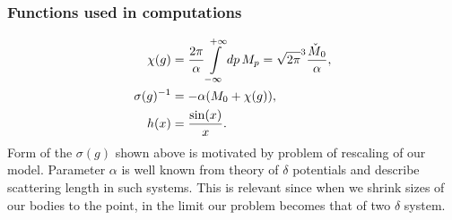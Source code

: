 \documentclass[10pt,t]{beamer}
\begin{document}
\begin{frame}
  \frametitle{Functions used in computations}

  \vspace{-2em}


  \begin{subequations}
    \begin{align}
      \label{eq:Scalar-field-and-two-quasi-deltas-07-A}
      \chi( g )
      &=
        \frac{ 2 \pi }{ \alpha }
        \int\limits_{ -\infty }^{ +\infty } dp \, M_{ p } =
        \sqrt{ 2 \pi }^{ 3 } \frac{ \check{M}_{ \hspace{0.05em} 0 } }{ \alpha }, \\
      \label{eq:Scalar-field-and-two-quasi-deltas-07-B}
      \sigma( g )^{ -1 }
      &=
        -\alpha ( M_{ 0 } + \chi( g ) ), \\
      \label{eq:Scalar-field-and-two-quasi-deltas-07-C}
      h( x )
      &=
        \frac{ \sin( x ) }{ x }.
    \end{align}
  \end{subequations}
  Form of the $\sigma( g )$ shown above is motivated by problem of rescaling
  of our model. Parameter $\alpha$ is well known from theory of $\delta$ potentials
  and describe scattering length in such systems. This is relevant
  since when we shrink sizes of our bodies to the point, in the limit
  our problem becomes that of two $\delta$ system.

\end{frame}
\end{document}
